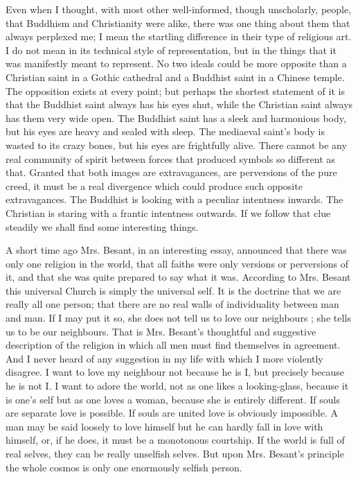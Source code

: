 \documentclass{book}
\begin{document}
Even when I thought, with most other well-informed, though unscholarly, people, that Buddhism and Christianity were alike, there was one thing about them that always perplexed me; I mean the startling difference in their type of religious art. I do not mean in its technical style of representation, but in the things that it was manifestly meant to represent. No two ideals could be more opposite than a Christian saint in a Gothic cathedral and a Buddhist saint in a Chinese temple. The opposition exists at every point; but perhaps the shortest statement of it is that the Buddhist saint always has his eyes shut, while the Christian saint always has them very wide open. The Buddhist saint has a sleek and harmonious body, but his eyes are heavy and sealed with sleep. The mediaeval saint’s body is wasted to its crazy bones, but his eyes are frightfully alive. There cannot be any real community of spirit between forces that produced symbols so different as that. Granted that both images are extravagances, are perversions of the pure creed, it must be a real divergence which could produce such opposite extravagances. The Buddhist is looking with a peculiar intentness inwards. The Christian is staring with a frantic intentness outwards. If we follow that clue steadily we shall find some interesting things.

A short time ago Mrs. Besant, in an interesting essay, announced that there was only one religion in the world, that all faiths were only versions or perversions of it, and that she was quite prepared to say what it was. According to Mrs. Besant this universal Church is simply the universal self. It is the doctrine that we are really all one person; that there are no real walls of individuality between man and man. If I may put it so, she does not tell us to love our neighbours ; she tells us to be our neighbours. That is Mrs. Besant’s thoughtful and suggestive description of the religion in which all men must find themselves in agreement. And I never heard of any suggestion in my life with which I more violently disagree. I want to love my neighbour not because he is I, but precisely because he is not I. I want to adore the world, not as one likes a looking-glass, because it is one’s self but as one loves a woman, because she is entirely different. If souls are separate love is possible. If souls are united love is obviously impossible. A man may be said loosely to love himself but he can hardly fall in love with himself, or, if he does, it must be a monotonous courtship. If the world is full of real selves, they can be really unselfish selves. But upon Mrs. Besant’s principle the whole cosmos is only one enormously selfish person.
\end{document}
